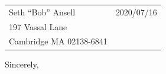 \documentclass[11pt]{article}%
\def\docdate{2020/07/16}%
\begin{document}
\begin{tabular*}{\columnwidth}{@{\extracolsep{\fill}}lr}%
  Seth ``Bob'' Ansell & \docdate \\
  197 Vassal Lane \\
  Cambridge MA 02138-6841
\end{tabular*}

\begin{multicols}{2}
\lipsum[1-6]
\end{multicols}

\begin{paracol}{2}\switchcolumn
Sincerely,

 \docfrom \\
 \doctitle\vspace{3ex}

\hbox{
%
\vtop{\hsize=0.9\linewidth \lipsum[7]}%
}
\end{paracol}
\end{document}
